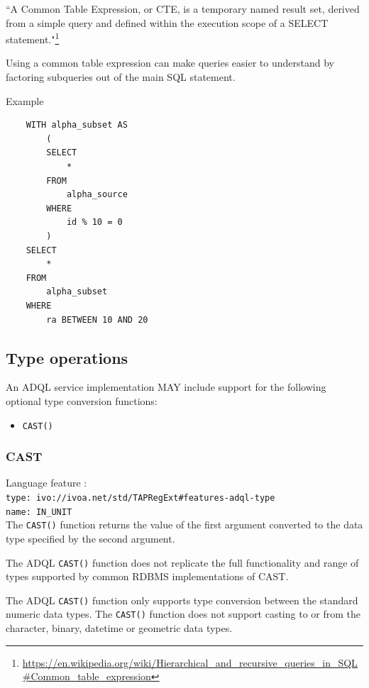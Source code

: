 \documentclass[11pt,a4paper]{ivoa}
\begin{document}
``A Common Table Expression, or CTE, is a temporary named result set, derived
from a simple query and defined within the execution scope of a SELECT
statement."\footnote{\url{https://en.wikipedia.org/wiki/Hierarchical\_and\_recursive\_queries\_in\_SQL\#Common\_table\_expression}}

Using a common table expression can make queries easier to understand by factoring
subqueries out of the main SQL statement.

Example 
\begin{verbatim}
    WITH alpha_subset AS
        (
        SELECT
            *
        FROM
            alpha_source
        WHERE
            id % 10 = 0
        )
    SELECT
        *
    FROM
        alpha_subset
    WHERE
        ra BETWEEN 10 AND 20
\end{verbatim}

\subsection{Type operations}
\label{sec:type}

An ADQL service implementation MAY include support for the following optional
type conversion functions:

\begin{itemize}
    \item \verb:CAST():
\end{itemize}

\subsubsection{CAST}
\label{sec:type.cast}
{\footnotesize Language feature :}\\
{\footnotesize \verb|type: ivo://ivoa.net/std/TAPRegExt#features-adql-type|}\\
{\footnotesize \verb|name: IN_UNIT|}\\

The \verb:CAST(): function returns the value of the first argument converted
to the data type specified by the second argument.

The ADQL \verb:CAST(): function does not replicate the full functionality
and range of types supported by common RDBMS implementations of CAST.

The ADQL \verb:CAST(): function only supports type conversion between the
standard numeric data types. The \verb:CAST(): function does not support
casting to or from the character, binary, datetime or geometric data types.
\end{document}
